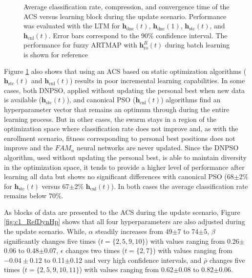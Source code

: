 \begin{figure}[!t]
  \centering
	\caption{Average classification rate, compression, and convergence time of the ACS versus learning block during the update scenario. Performance was evaluated with the LTM for $\textbf{h}_\text{dnc}(t)$, $\textbf{h}_\text{dnc}(1)$, $\textbf{h}_\text{stc}(t)$, and $\textbf{h}_\text{cnl}(t)$. Error bars correspond to the 90\% confidence interval. The performance for fuzzy ARTMAP with $\textbf{h}_\text{ro}^B(t)$ during batch learning is shown for reference}
	\label{fig:c1_RefDyn}
\end{figure}


Figure \ref{fig:c1_RefDyn} also shows that using an ACS based on static optimization algorithms ($\textbf{h}_\text{stc}(t)$ and $\textbf{h}_\text{cnl}(t)$) results in poor incremental learning capabilities. In some cases, both DNPSO, applied without updating the personal best when new data is available ($\textbf{h}_\text{stc}(t)$), and canonical PSO ($\textbf{h}_\text{cnl}(t)$) algorithms find an hyperparameter vector that remains an optimum through during the entire learning process. But in other cases, the swarm stays in a region of the optimization space where classification rate does not improve and, as with the enrollment scenario, fitness corresponding to personal best positions does not improve and the $\textit{FAM}_n$ neural networks are never updated. Since the DNPSO algorithm, used without updating the personal best, is able to maintain diversity in the optimization space, it tends to provide a higher level of performance after learning all data but shows no significant differences with canonical PSO (68$\pm$2\% for $\textbf{h}_\text{stc}(t)$ versus 67$\pm$2\% $\textbf{h}_\text{cnl}(t)$). In both cases the average classification rate remains below 70\%.

As blocks of data are presented to the ACS during the update scenario, Figure \ref{fig:c1_RefDynHp} shows that all four hyperparameters are also adjusted during the update scenario. While, $\alpha$ steadily increases from 49$\pm$7 to 74$\pm$5, $\beta$ significantly changes five times ($t=\{2,5,9,10\}$) with values ranging from 0.26$\pm$0.06 to 0.48$\pm$0.07, $\epsilon$ changes two times ($t=\{2,7\}$) with values ranging from $-0.04\pm0.12$ to 0.11$\pm$0.12 and very high confidence intervals, and $\bar{\rho}$ changes five times ($t=\{2,5,9,10,11\}$) with values ranging from 0.62$\pm$0.08 to 0.82$\pm$0.06.

